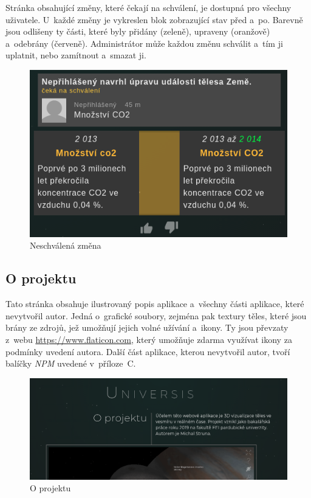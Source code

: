 \documentclass[a4paper,12pt]{article}
\begin{document}
Stránka obsahující změny, které čekají na schválení, je dostupná pro všechny uživatele. U~každé změny je vykreslen blok zobrazující stav před a~po. Barevně jsou odlišeny ty části, které byly přidány (zeleně), upraveny (oranžově) a~odebrány (červeně). Administrátor může každou změnu schválit a~tím ji uplatnit, nebo zamítnout a~smazat ji.

\begin{figure}[H]
\begin{center}
\includegraphics[width=350pt]{Images/Approval.png}
\caption{Neschválená změna}
\end{center}
\end{figure}


\subsection{O projektu}

Tato stránka obsahuje ilustrovaný popis aplikace a~všechny části aplikace, které nevytvořil autor. Jedná o~grafické soubory, zejména pak textury těles, které jsou brány ze zdrojů, jež umožňují jejich volné užívání a~ikony. Ty jsou převzaty z~webu \url{https://www.flaticon.com}, který umožňuje zdarma využívat ikony za podmínky uvedení autora. Další část aplikace, kterou nevytvořil autor, tvoří balíčky \textit{NPM} uvedené v~příloze~C.

\begin{figure}[H]
\begin{center}
\includegraphics[width=440pt]{Images/About.png}
\caption{O projektu}
\end{center}
\end{figure}
\end{document}
